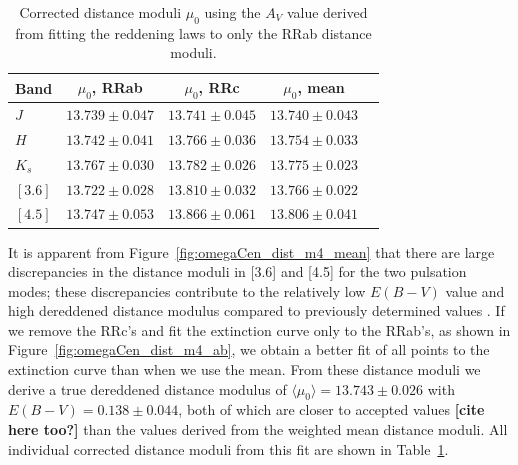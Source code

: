 \documentclass[a4paper,fleqn,usenatbib]{mnras}
\begin{document}
\endgroup

\begin{table}
\centering
\caption{Corrected distance moduli $\mu_0$ using the $A_V$ value derived from fitting the reddening laws to only the RRab distance moduli.}
\label{tab:dist_mod_ab}
\begin{tabular}{l||c|c|c|r} 
\hline \hline
Band & $\mu_0$, RRab & $\mu_0$, RRc & $\mu_0$, mean \\
\hline
$J$ & $13.739 \pm 0.047$ & $13.741 \pm 0.045$ & $13.740 \pm 0.043$ \\
$H$ & $13.742 \pm 0.041$ & $13.766 \pm 0.036$ & $13.754 \pm 0.033$ \\
$K_s$ & $13.767 \pm 0.030$ & $13.782 \pm 0.026$ & $13.775 \pm 0.023$ \\
$[3.6]$ & $13.722 \pm 0.028$ & $13.810 \pm 0.032$ & $13.766 \pm 0.022$ \\
$[4.5]$ & $13.747 \pm 0.053$ & $13.866 \pm 0.061$ & $13.806 \pm 0.041$ \\
\hline
\end{tabular}
\end{table}

It is apparent from Figure~\ref{fig:omegaCen_dist_m4_mean} that there are large discrepancies in the distance moduli in [3.6] and [4.5] for the two pulsation modes; these discrepancies contribute to the relatively low $E(B-V)$ value and high dereddened distance modulus compared to previously determined values \citep[e.g.][]{2002ASPC..265...95L, 2006ApJ...652..362D}. 
If we remove the RRc's and fit the extinction curve only to the RRab's, as shown in Figure~\ref{fig:omegaCen_dist_m4_ab}, we obtain a better fit of all points to the extinction curve than when we use the mean. From these distance moduli we derive a true dereddened distance modulus of $\langle \mu_0 \rangle = 13.743 \pm 0.026$ with $E(B-V) = 0.138 \pm 0.044$, both of which are closer to accepted values {\bf[cite here too?]} than the values derived from the weighted mean distance moduli. All individual corrected distance moduli from this fit are shown in Table~\ref{tab:dist_mod_ab}.
\end{document}
